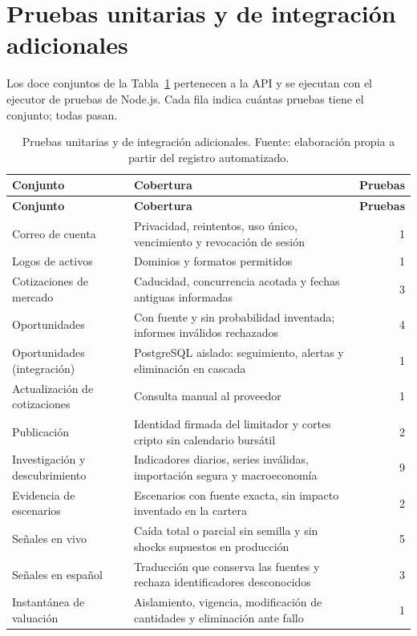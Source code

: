 \section*{Pruebas unitarias y de integración adicionales}
Los doce conjuntos de la Tabla~\ref{tab:casos-unitarios} pertenecen a la API y se ejecutan con el ejecutor de pruebas de Node.js. Cada fila indica cuántas pruebas tiene el conjunto; todas pasan.
\begin{longtable}{>{\raggedright\arraybackslash}p{}>{\raggedright\arraybackslash}p{}r}
\caption{Pruebas unitarias y de integración adicionales. Fuente: elaboración propia a partir del registro automatizado.}\label{tab:casos-unitarios}\\
\hline
\textbf{Conjunto} & \textbf{Cobertura} & \textbf{Pruebas}\\\hline\endfirsthead
\hline
\textbf{Conjunto} & \textbf{Cobertura} & \textbf{Pruebas}\\\hline\endhead
Correo de cuenta & Privacidad, reintentos, uso único, vencimiento y revocación de sesión & 1 \\\hline
Logos de activos & Dominios y formatos permitidos & 1 \\\hline
Cotizaciones de mercado & Caducidad, concurrencia acotada y fechas antiguas informadas & 3 \\\hline
Oportunidades & Con fuente y sin probabilidad inventada; informes inválidos rechazados & 4 \\\hline
Oportunidades (integración) & PostgreSQL aislado: seguimiento, alertas y eliminación en cascada & 1 \\\hline
Actualización de cotizaciones & Consulta manual al proveedor & 1 \\\hline
Publicación & Identidad firmada del limitador y cortes cripto sin calendario bursátil & 2 \\\hline
Investigación y descubrimiento & Indicadores diarios, series inválidas, importación segura y macroeconomía & 9 \\\hline
Evidencia de escenarios & Escenarios con fuente exacta, sin impacto inventado en la cartera & 2 \\\hline
Señales en vivo & Caída total o parcial sin semilla y sin shocks supuestos en producción & 5 \\\hline
Señales en español & Traducción que conserva las fuentes y rechaza identificadores desconocidos & 3 \\\hline
Instantánea de valuación & Aislamiento, vigencia, modificación de cantidades y eliminación ante fallo & 1 \\\hline
\end{longtable}

